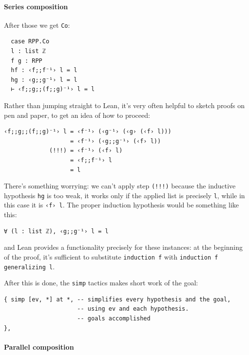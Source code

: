 \documentclass{book}
\theoremstyle{definition}
\theoremstyle{remark}
\theoremstyle{plain}
\begin{document}
\paragraph{Series composition}

After those we get \lstinline{Co}:
\begin{lstlisting}
  case RPP.Co
  l : list ℤ
  f g : RPP
  hf : ‹f;;f⁻¹› l = l
  hg : ‹g;;g⁻¹› l = l
  ⊢ ‹f;;g;;(f;;g)⁻¹› l = l
\end{lstlisting}
Rather than jumping straight to Lean,
it's very often helpful to sketch proofs on pen and paper, to get an idea of how to proceed:
\begin{lstlisting}
‹f;;g;;(f;;g)⁻¹› l = ‹f⁻¹› (‹g⁻¹› (‹g› (‹f› l)))
                   = ‹f⁻¹› (‹g;;g⁻¹› (‹f› l))
             (!!!) = ‹f⁻¹› (‹f› l)
                   = ‹f;;f⁻¹› l
                   = l
\end{lstlisting}
There's something worrying:
we can't apply step \lstinline{(!!!)} because the inductive hypothesis \lstinline{hg} is too weak,
it works only if the applied list is precisely \lstinline{l}, while in this case it is \lstinline{‹f› l}.
The proper induction hypothesis would be something like this:
\begin{lstlisting}
∀ (l : list ℤ), ‹g;;g⁻¹› l = l
\end{lstlisting}
and Lean provides a functionality precisely for these instances:
at the beginning of the proof, it's sufficient to substitute \lstinline{induction f} with \lstinline{induction f generalizing l}.

After this is done, the \lstinline{simp} tactics makes short work of the goal:
\begin{lstlisting}
{ simp [ev, *] at *, -- simplifies every hypothesis and the goal,
                     -- using ev and each hypothesis.
                     -- goals accomplished
},
\end{lstlisting}

\paragraph{Parallel composition}
\end{document}
